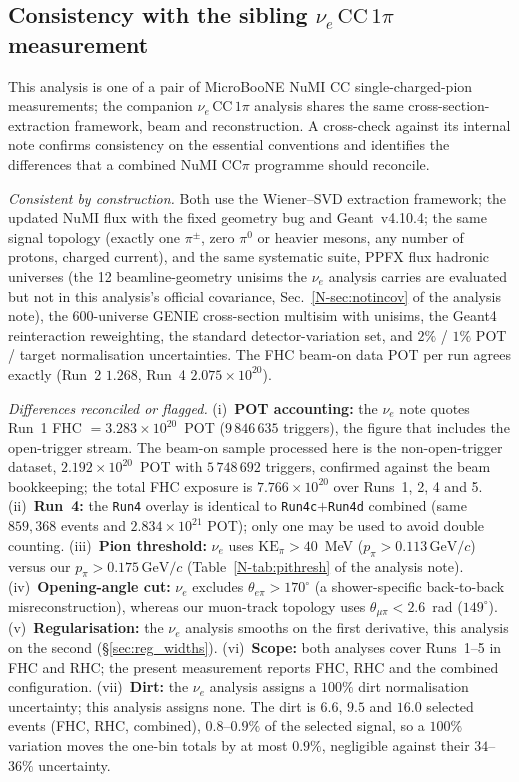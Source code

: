 \documentclass[11pt,a4paper]{article}
\newcommand{\GeVc}{\,\text{GeV}\!/c}
\newcommand{\noteref}[2]{#1~\ref{N-#2} of the analysis note}
\begin{document}
\subsection{Consistency with the sibling $\nu_e\,\mathrm{CC}\,1\pi$ measurement}
\label{sec:nueconsistency}

This analysis is one of a pair of MicroBooNE NuMI CC single-charged-pion
measurements; the companion $\nu_e\,\mathrm{CC}\,1\pi$ analysis shares the same
cross-section-extraction framework, beam and reconstruction. A cross-check against
its internal note confirms consistency on the essential conventions and identifies
the differences that a combined NuMI CC$\pi$ programme should reconcile.

\emph{Consistent by construction.} Both use the Wiener--SVD extraction framework;
the updated NuMI flux with the fixed geometry bug and Geant~v4.10.4; the same
signal topology (exactly one $\pi^\pm$, zero $\pi^0$ or heavier mesons, any number
of protons, charged current), and the same systematic suite, PPFX flux
hadronic universes (the 12 beamline-geometry unisims the $\nu_e$ analysis carries are
evaluated but not in this analysis's official covariance, \noteref{Sec.}{sec:notincov}), the
600-universe GENIE cross-section multisim with unisims, the Geant4 reinteraction
reweighting, the standard detector-variation set, and $2\%$ / $1\%$ POT / target
normalisation uncertainties. The FHC beam-on data POT per run
agrees exactly (Run~2 $1.268$, Run~4 $2.075\times10^{20}$).

\emph{Differences reconciled or flagged.} (i)~\textbf{POT accounting:} the
$\nu_e$ note quotes Run~1 FHC $=3.283\times10^{20}$~POT ($9\,846\,635$ triggers), the
figure that includes the open-trigger stream. The beam-on sample processed here is the
non-open-trigger dataset, $2.192\times10^{20}$~POT with $5\,748\,692$ triggers, confirmed
against the beam bookkeeping; the total FHC exposure is $7.766\times10^{20}$ over Runs~1, 2, 4
and 5. (ii)~\textbf{Run~4:} the \texttt{Run4} overlay
is identical to \texttt{Run4c}$+$\texttt{Run4d} combined (same $859{,}368$ events
and $2.834\times10^{21}$ POT); only one may be used to avoid double counting.
(iii)~\textbf{Pion threshold:} $\nu_e$ uses $\mathrm{KE}_\pi>40$~MeV
($p_\pi>0.113\GeVc$) versus our $p_\pi>0.175\GeVc$
(\noteref{Table}{tab:pithresh}). (iv)~\textbf{Opening-angle cut:} $\nu_e$ excludes
$\theta_{e\pi}>170^\circ$ (a shower-specific back-to-back misreconstruction),
whereas our muon-track topology uses $\theta_{\mu\pi}<2.6$~rad ($149^\circ$).
(v)~\textbf{Regularisation:} the $\nu_e$ analysis smooths on the first derivative,
this analysis on the second (\S\ref{sec:reg_widths}). (vi)~\textbf{Scope:}
both analyses cover Runs~1--5 in FHC and RHC; the present measurement reports FHC,
RHC and the combined configuration. (vii)~\textbf{Dirt:} the $\nu_e$ analysis assigns a $100\%$ dirt
normalisation uncertainty; this analysis assigns none. The dirt is $6.6$, $9.5$ and $16.0$ selected events
(FHC, RHC, combined), $0.8$--$0.9\%$ of the selected signal, so a $100\%$ variation moves the one-bin totals
by at most $0.9\%$, negligible against their $34$--$36\%$ uncertainty.
\end{document}
